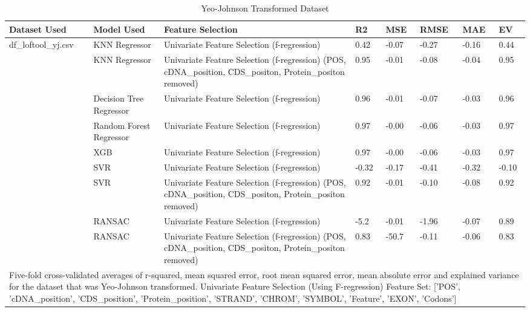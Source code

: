 \documentclass[journal,two side,web]{ieeecolor}
\begin{document}
\clearpage
\begin{table}
\centering
\begin{minipage}{\textwidth}
\centering
\caption{Yeo-Johnson Transformed Dataset}
\label{table}
\setlength{\tabcolsep}{3pt}
\begin{tabular}{|p{50pt}|p{100pt}|p{150pt}|p{25pt}|p{25pt}|p{25pt}|p{25pt}|p{25
pt}|}
\hline
Dataset Used & Model Used & Feature Selection & R2 & MSE & RMSE & MAE & EV \\
\hline
df\_loftool\_yj.csv & KNN Regressor & Univariate Feature Selection (f-regression) & 0.42 & -0.07 & -0.27 & -0.16 & 0.44 \\
\hline
 & KNN Regressor & Univariate Feature Selection (f-regression) (POS, cDNA\_position, CDS\_positon, Protein\_positon removed) & 0.95 & -0.01 & -0.08 & -0.04 & 0.95 \\
\hline
 & Decision Tree Regressor & Univariate Feature Selection (f-regression) & 0.96 & -0.01 & -0.07 & -0.03 & 0.96 \\
\hline
& Random Forest Regressor & Univariate Feature Selection (f-regression) & 0.97 & -0.00 & -0.06 & -0.03 & 0.97 \\
\hline
 & XGB & Univariate Feature Selection (f-regression) & 0.97 & -0.00 & -0.06 & -0.03 & 0.97 \\
\hline
& SVR & Univariate Feature Selection (f-regression) & -0.32 & -0.17 & -0.41 & -0.32 & -0.10 \\
\hline
 & SVR & Univariate Feature Selection (f-regression) (POS, cDNA\_position, CDS\_positon, Protein\_positon removed) & 0.92 & -0.01 & -0.10 & -0.08 & 0.92 \\
\hline
& RANSAC & Univariate Feature Selection (f-regression) & -5.2 & -0.01 & -1.96 & -0.07 & 0.89 \\
\hline
 & RANSAC & Univariate Feature Selection (f-regression) (POS, cDNA\_position, CDS\_positon, Protein\_positon removed) & 0.83 & -50.7 & -0.11 & -0.06 & 0.83 \\
\hline
\multicolumn{8}{p{450pt}}{Five-fold cross-validated averages of r-squared, mean squared error, root mean squared error, mean absolute error and explained variance for the dataset that was Yeo-Johnson transformed. Univariate Feature Selection (Using F-regression) Feature Set: ['POS', 'cDNA\_position', 'CDS\_position', 'Protein\_position', 'STRAND', 'CHROM', 'SYMBOL', 'Feature', 'EXON', 'Codons']}\\
\end{tabular}
\end{minipage}
\end{table}
\end{document}
